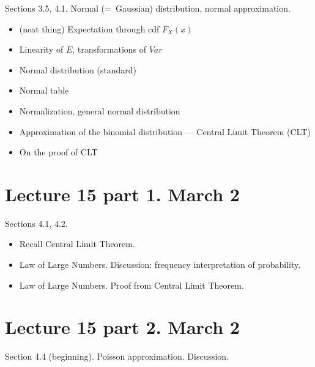 \documentclass[letterpaper,11pt,oneside,reqno]{amsart}
\numberwithin{equation}{section}
\theoremstyle{definition}
\begin{document}
Sections 3.5, 4.1. 
Normal (=~Gaussian) distribution, normal approximation.
\begin{itemize}
	\item (neat thing) Expectation through cdf $F_X(x)$
	\item Linearity of $E$, transformations of $Var$
	\item Normal distribution (standard)
	\item Normal table
	\item Normalization, general normal distribution
	\item Approximation of the binomial distribution --- Central Limit Theorem (CLT)
	\item On the proof of CLT
\end{itemize}

\section*{Lecture 15 part 1. March 2}

Sections 4.1, 4.2.
\begin{itemize}
	\item Recall Central Limit Theorem. 
	\item Law of Large Numbers. Discussion: frequency interpretation of probability.
	\item Law of Large Numbers. Proof from Central Limit Theorem.
\end{itemize}

\section*{Lecture 15 part 2. March 2}

Section 4.4 (beginning). Poisson approximation. Discussion.
\end{document}
